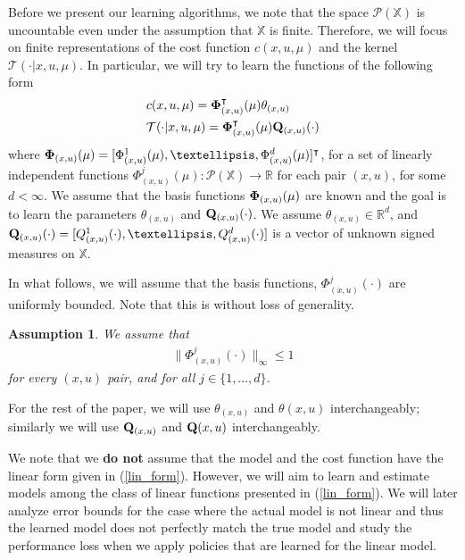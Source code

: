 \documentclass[twoside,11pt]{article}
\newtheorem{assumption}{Assumption}[section]
\def\P{{\mathcal P}}
\begin{document}
Before we present our learning algorithms, we note that the space $\P(\mathds{X})$ is uncountable even under the assumption that $\mathds{X}$ is finite. Therefore, we will focus on finite representations of the cost function $c(x,u,\mu)$ and the kernel $\mathcal{T}(\cdot|x,u,\mu)$. In particular, we will try to learn the functions of the following form
\begin{align}\label{lin_form}
&c(x,u,\mu) =  {\bf \Phi}_{(x,u)}^\intercal(\mu) {\bf \theta}_{(x,u)}\nonumber\\
&\mathcal{T}(\cdot|x,u,\mu) = {\bf \Phi}_{(x,u)}^\intercal(\mu) {\bf Q}_{(x,u)}(\cdot)
\end{align}
where ${\bf \Phi}_{(x,u)}(\mu) =[ \Phi^1_{(x,u)}(\mu),\dots,\Phi^d_{(x,u)}(\mu)]^\intercal$,  for a set of linearly independent functions $ \Phi^j_{(x,u)}(\mu):\P(\mathds{X})\to \mathds{R}$ for each pair $(x,u)$, for some $d<\infty$. We assume that the basis functions ${\bf \Phi}_{(x,u)}(\mu)$ are known and the goal is to learn the parameters $\theta_{(x,u)}$ and ${\bf Q}_{(x,u)}(\cdot)$.  We assume $\theta_{(x,u)}\in\mathds{R}^d$, and ${\bf Q}_{(x,u)}(\cdot) = [Q^1_{(x,u)}(\cdot), \dots, Q_{(x,u)}^d(\cdot)]$ is a vector of unknown signed measures on $\mathds{X}$. 

In what follows, we will assume that the basis functions, $\Phi^j_{(x,u)}(\cdot)$ are uniformly bounded. Note that this is without loss of generality. 
\begin{assumption}\label{bdd_assmp}
We assume that 
\begin{align*}
\|\Phi^j_{(x,u)}(\cdot)\|_\infty\leq 1
\end{align*}
for every $(x,u)$ pair, and for all $j\in\{1,\dots,d\}$.
\end{assumption}

For the rest of the paper, we will use $\theta_{(x,u)}$ and $\theta(x,u)$ interchangeably; similarly we will use ${\bf Q}_{(x,u)}$ and ${\bf Q}(x,u)$ interchangeably.

\begin{remark}
We note that we {\bf do not} assume that the model and the cost function have the linear form given in (\ref{lin_form}). However, we will aim to learn and estimate models among the class of linear functions presented in (\ref{lin_form}). We will later analyze error bounds for the case where the actual model is not linear and thus the learned model does not perfectly match the true model and study the performance loss when we apply policies that are learned for the linear model.
\end{remark}
\end{document}
